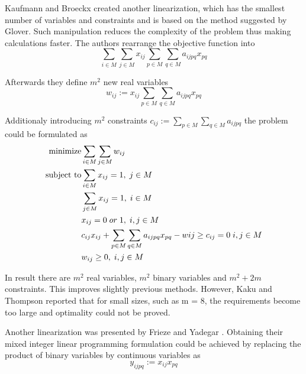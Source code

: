 Kaufmann and Broeckx created another linearization, which has the smallest number of variables and constraints \cite{kaufman1978algorithm} and is based on the method suggested by Glover.
Such manipulation reduces the complexity of the problem thus making calculations faster.
The authors rearrange the objective function into
\begin{equation}
  \sum_{i \in M} \sum_{j \in M} x_{ij} \sum_{p \in M} \sum_{q \in M} a_{ijpq} x_{pq}
\end{equation}

Afterwards they define $m^2$ new real variables
\begin{equation}
  w_{ij} := x_{ij}\sum_{p \in M} \sum_{q \in M} a_{ijpq} x_{pq}
\end{equation}

Additionaly introducing $m^2$ constraints $ c_{ij} := \sum_{p \in M} \sum_{q \in M} a_{ijpq} $ the problem could be formulated as
\begin{align}
  \text{minimize} &\null \sum_{i \in M} \sum_{j \in M} w_{ij}\\
  \text{subject to} &\null \sum_{i \in M} x_{ij} = 1, \; j \in M \\
  &\null \sum_{j \in M} x_{ij} = 1, \; i \in M \\
  &\null x_{ij} = 0 \; or \; 1, \; i, j \in M \\
  &\null c_{ij}x_{ij} + \sum_{p \in M} \sum_{q \in M} a_{ijpq}x_{pq} - w{ij} \geq c_{ij} = 0 \; i, j \in M \\
  &\null w_{ij} \geq 0, \; i, j \in M \\
\end{align}

In result there are $m^2$ real variables, $m^2$ binary variables and $m^2 + 2m$ constraints.
This improves slightly previous methods.
However, Kaku and Thompson reported \cite{kaku1986exact} that for small sizes, such as m = 8, the requirements become too large and optimality could not be proved.

Another linearization was presented by Frieze and Yadegar \cite{frieze1983quadratic}.
Obtaining their mixed integer linear programming formulation could be achieved by replacing the product of binary variables by continuous variables as
\begin{equation}
  y_{ijpq} := x_{ij} x_{pq}
\end{equation}

